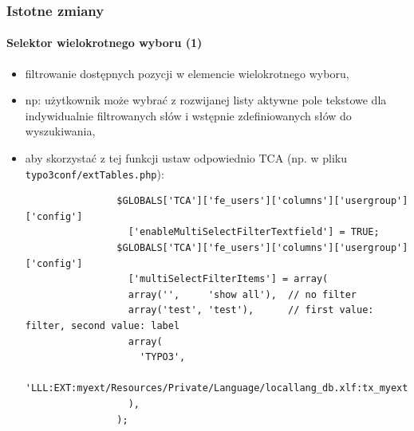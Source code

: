 \begin{frame}[fragile]
	\frametitle{Istotne zmiany}
	\framesubtitle{Selektor wielokrotnego wyboru (1)}

	\lstset{
		basicstyle=\tiny\ttfamily
	}

	\begin{itemize}
		\item filtrowanie dostępnych pozycji w elemencie wielokrotnego wyboru,
		\item np: użytkownik może wybrać z rozwijanej listy aktywne pole tekstowe dla indywidualnie filtrowanych słów i wstępnie zdefiniowanych słów do wyszukiwania,

		\item aby skorzystać z tej funkcji ustaw odpowiednio TCA\newline
			(np. w pliku \texttt{typo3conf/extTables.php}):


			\begin{lstlisting}
				$GLOBALS['TCA']['fe_users']['columns']['usergroup']['config']
				  ['enableMultiSelectFilterTextfield'] = TRUE;
				$GLOBALS['TCA']['fe_users']['columns']['usergroup']['config']
				  ['multiSelectFilterItems'] = array(
				  array('',     'show all'),  // no filter
				  array('test', 'test'),      // first value: filter, second value: label
				  array(
				    'TYPO3',
				    'LLL:EXT:myext/Resources/Private/Language/locallang_db.xlf:tx_myext.label.typo3'
				  ),
				);
			\end{lstlisting}

	\end{itemize}

\end{frame}


